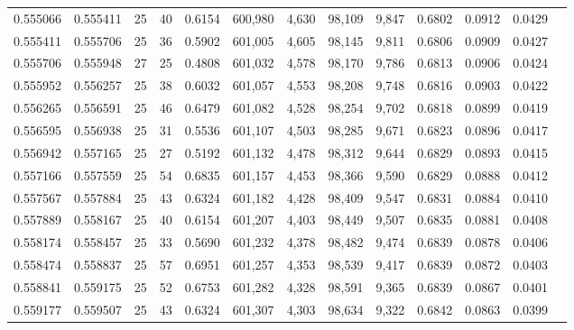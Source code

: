 \begin{tabular}{rrrrrrrrrrrrr}
0.555066 & 0.555411 &    25 &  40 &                                     0.6154 & 600,980 &   4,630 &  98,109 &   9,847 & 0.6802 & 0.0912 & 0.0429 \\
0.555411 & 0.555706 &    25 &  36 &                                     0.5902 & 601,005 &   4,605 &  98,145 &   9,811 & 0.6806 & 0.0909 & 0.0427 \\
0.555706 & 0.555948 &    27 &  25 &                                     0.4808 & 601,032 &   4,578 &  98,170 &   9,786 & 0.6813 & 0.0906 & 0.0424 \\
0.555952 & 0.556257 &    25 &  38 &                                     0.6032 & 601,057 &   4,553 &  98,208 &   9,748 & 0.6816 & 0.0903 & 0.0422 \\
0.556265 & 0.556591 &    25 &  46 &                                     0.6479 & 601,082 &   4,528 &  98,254 &   9,702 & 0.6818 & 0.0899 & 0.0419 \\
0.556595 & 0.556938 &    25 &  31 &                                     0.5536 & 601,107 &   4,503 &  98,285 &   9,671 & 0.6823 & 0.0896 & 0.0417 \\
0.556942 & 0.557165 &    25 &  27 &                                     0.5192 & 601,132 &   4,478 &  98,312 &   9,644 & 0.6829 & 0.0893 & 0.0415 \\
0.557166 & 0.557559 &    25 &  54 &                                     0.6835 & 601,157 &   4,453 &  98,366 &   9,590 & 0.6829 & 0.0888 & 0.0412 \\
0.557567 & 0.557884 &    25 &  43 &                                     0.6324 & 601,182 &   4,428 &  98,409 &   9,547 & 0.6831 & 0.0884 & 0.0410 \\
0.557889 & 0.558167 &    25 &  40 &                                     0.6154 & 601,207 &   4,403 &  98,449 &   9,507 & 0.6835 & 0.0881 & 0.0408 \\
0.558174 & 0.558457 &    25 &  33 &                                     0.5690 & 601,232 &   4,378 &  98,482 &   9,474 & 0.6839 & 0.0878 & 0.0406 \\
0.558474 & 0.558837 &    25 &  57 &                                     0.6951 & 601,257 &   4,353 &  98,539 &   9,417 & 0.6839 & 0.0872 & 0.0403 \\
0.558841 & 0.559175 &    25 &  52 &                                     0.6753 & 601,282 &   4,328 &  98,591 &   9,365 & 0.6839 & 0.0867 & 0.0401 \\
0.559177 & 0.559507 &    25 &  43 &                                     0.6324 & 601,307 &   4,303 &  98,634 &   9,322 & 0.6842 & 0.0863 & 0.0399 \\

\end{tabular}

